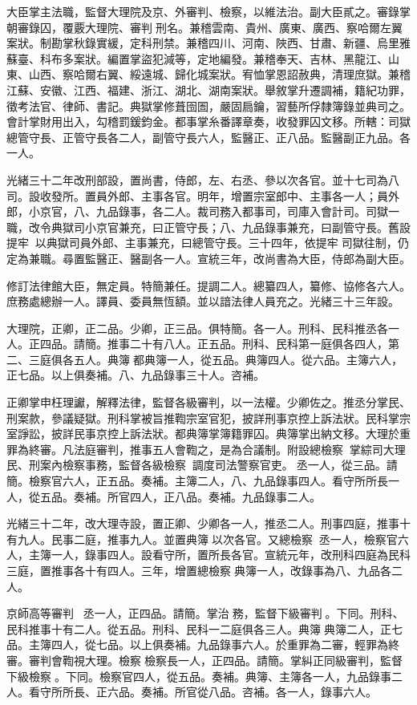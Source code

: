 \begin{pinyinscope}
大臣掌主法職，監督大理院及京、外審判、檢察，以維法治。副大臣貳之。審錄掌朝審錄囚，覆覈大理院、審判刑名。兼稽雲南、貴州、廣東、廣西、察哈爾左翼案狀。制勘掌秋錄實緩，定科刑禁。兼稽四川、河南、陜西、甘肅、新疆、烏里雅蘇臺、科布多案狀。編置掌盜犯減等，定地編發。兼稽奉天、吉林、黑龍江、山東、山西、察哈爾右翼、綏遠城、歸化城案狀。宥恤掌恩詔赦典，清理庶獄。兼稽江蘇、安徽、江西、福建、浙江、湖北、湖南案狀。舉敘掌升遷調補，籍紀功罪，徵考法官、律師、書記。典獄掌修葺囹圄，嚴固扃鑰，習藝所俘隸簿錄並典司之。會計掌財用出入，勾稽罰鍰鈞金。都事掌糸番譯章奏，收發罪囚文移。所轄：司獄總管守長、正管守長各二人，副管守長六人，監醫正、正八品。監醫副正九品。各一人。

光緒三十二年改刑部設，置尚書，侍郎，左、右丞、參以次各官。並十七司為八司。設收發所。置員外郎、主事各官。明年，增置宗室郎中、主事各一人；員外郎，小京官，八、九品錄事，各二人。裁司務入都事司，司庫入會計司。司獄一職，改令典獄司小京官兼充，曰正管守長；八、九品錄事兼充，曰副管守長。舊設提牢，以典獄司員外郎、主事兼充，曰總管守長。三十四年，依提牢司獄往制，仍定為兼職。尋置監醫正、醫副各一人。宣統三年，改尚書為大臣，侍郎為副大臣。

修訂法律館大臣，無定員。特簡兼任。提調二人。總纂四人，纂修、協修各六人。庶務處總辦一人。譯員、委員無恆額。並以諳法律人員充之。光緒三十三年設。

大理院，正卿，正二品。少卿，正三品。俱特簡。各一人。刑科、民科推丞各一人。正四品。請簡。推事二十有八人。正五品。刑科、民科第一庭俱各四人，第二、三庭俱各五人。典簿都典簿一人，從五品。典簿四人。從六品。主簿六人，正七品。以上俱奏補。八、九品錄事三十人。咨補。

正卿掌申枉理讞，解釋法律，監督各級審判，以一法權。少卿佐之。推丞分掌民、刑案款，參議疑獄。刑科掌被旨推鞫宗室官犯，披詳刑事京控上訴法狀。民科掌宗室諍訟，披詳民事京控上訴法狀。都典簿掌簿籍罪囚。典簿掌出納文移。大理於重罪為終審。凡法庭審判，推事五人會鞫之，是為合議制。附設總檢察，掌綜司大理民、刑案內檢察事務，監督各級檢察，調度司法警察官吏。丞一人，從三品。請簡。檢察官六人，正五品。奏補。主簿二人，八、九品錄事四人。看守所所長一人，從五品。奏補。所官四人，正八品。奏補。九品錄事二人。

光緒三十二年，改大理寺設，置正卿、少卿各一人，推丞二人。刑事四庭，推事十有九人。民事二庭，推事九人。並置典簿以次各官。又總檢察丞一人，檢察官六人，主簿一人，錄事四人。設看守所，置所長各官。宣統元年，改刑科四庭為民科三庭，置推事各十有四人。三年，增置總檢察典簿一人，改錄事為八、九品各二人。

京師高等審判，丞一人，正四品。請簡。掌治務，監督下級審判。下同。刑科、民科推事十有二人。從五品。刑科、民科一二庭俱各三人。典簿典簿二人，正七品。主簿四人，從七品。以上俱奏補。九品錄事六人。於重罪為二審，輕罪為終審。審判會鞫視大理。檢察檢察長一人，正四品。請簡。掌糾正同級審判，監督下級檢察。下同。檢察官四人，從五品。奏補。典簿、主簿各一人，九品錄事二人。看守所所長、正六品。奏補。所官從八品。咨補。各一人，錄事六人。


\end{pinyinscope}
